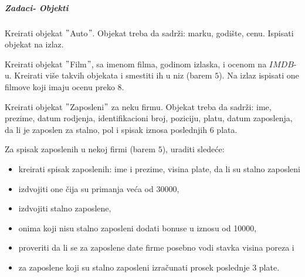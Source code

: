 \subparagraph{Zadaci- Objekti}
\begin{primer}
Kreirati objekat $"$Auto$"$. Objekat treba da sadrži: marku, godište, cenu.
Ispisati objekat na izlaz.
\end{primer}

\begin{primer}
Kreirati objekat $"$Film$"$, sa imenom filma, godinom izlaska, i ocenom na $IMDB$-u. Kreirati više takvih objekata i smestiti ih u niz (barem $5$). Na izlaz ispisati one filmove koji imaju ocenu preko $8$.  
\end{primer}

\begin{primer}
Kreirati objekat $"$Zaposleni$"$ za neku firmu. Objekat treba da sadrži: ime, prezime, datum rodjenja, identifikacioni broj, poziciju, platu, datum zaposlenja, da li je zaposlen za stalno, pol i spisak iznosa poslednjih $6$ plata.
\end{primer}

\begin{primer}
Za spisak zaposlenih u nekoj firmi (barem $5$), uraditi sledeće:
\begin{itemize}
	\item kreirati spisak zaposlenih: ime i prezime, visina plate, da li su stalno zaposleni
	\item izdvojiti one čija su primanja veća od 30000,
	\item izdvojiti stalno zaposlene,
	\item onima koji nisu stalno zaposleni dodati bonuse u iznosu od 10000,	
	\item proveriti da li se za zaposlene date firme posebno vodi stavka visina poreza i
	\item za zaposlene koji su stalno zaposleni izračunati prosek poslednje 3 plate.
\end{itemize}

\end{primer}

